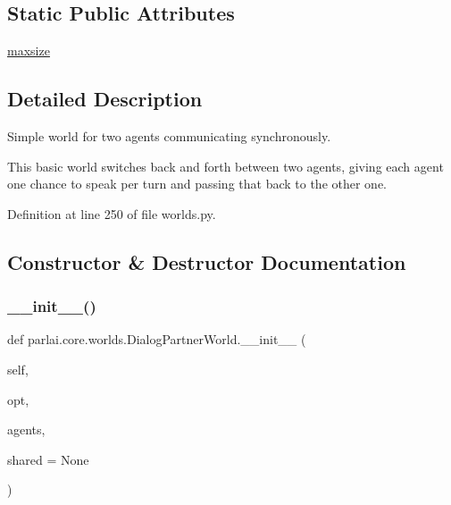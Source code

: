 \subsection*{Static Public Attributes}
\begin{DoxyCompactItemize}
\item 
\hyperlink{classparlai_1_1core_1_1worlds_1_1DialogPartnerWorld_acae28d33fb7d494b7df84d0f8c57eb23}{maxsize}
\end{DoxyCompactItemize}


\subsection{Detailed Description}
\begin{DoxyVerb}Simple world for two agents communicating synchronously.

This basic world switches back and forth between two agents, giving each
agent one chance to speak per turn and passing that back to the other one.
\end{DoxyVerb}
 

Definition at line 250 of file worlds.\+py.



\subsection{Constructor \& Destructor Documentation}
\mbox{\label{classparlai_1_1core_1_1worlds_1_1DialogPartnerWorld_a21ea86d832ae73e670fcfbaea943e1c0}} 
\subsubsection{\texorpdfstring{\+\_\+\+\_\+init\+\_\+\+\_\+()}{\_\_init\_\_()}}
{\footnotesize\ttfamily def parlai.\+core.\+worlds.\+Dialog\+Partner\+World.\+\_\+\+\_\+init\+\_\+\+\_\+ (\begin{DoxyParamCaption}\item[{}]{self,  }\item[{}]{opt,  }\item[{}]{agents,  }\item[{}]{shared = {\ttfamily None} }\end{DoxyParamCaption})}



